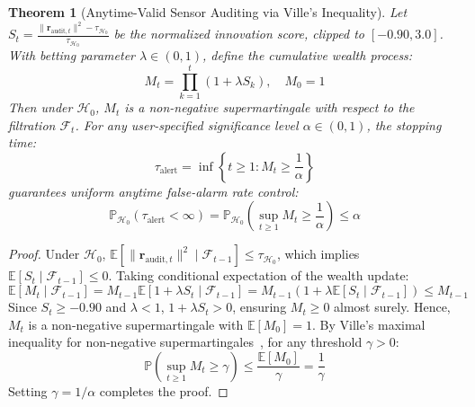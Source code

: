 \documentclass[11pt,a4paper]{article}
\newtheorem{theorem}{Theorem}[section]
\begin{document}
\begin{theorem}[Anytime-Valid Sensor Auditing via Ville's Inequality]
Let $S_t = \frac{\|\mathbf{r}_{\text{audit}, t}\|^2 - \tau_{\mathcal{H}_0}}{\tau_{\mathcal{H}_0}}$ be the normalized innovation score, clipped to $[-0.90, 3.0]$. With betting parameter $\lambda \in (0, 1)$, define the cumulative wealth process:
\begin{equation}
M_t = \prod_{k=1}^t (1 + \lambda S_k), \quad M_0 = 1
\label{eq:ville_wealth}
\end{equation}
Then under $\mathcal{H}_0$, $M_t$ is a non-negative supermartingale with respect to the filtration $\mathcal{F}_t$. For any user-specified significance level $\alpha \in (0, 1)$, the stopping time:
\begin{equation}
\tau_{\text{alert}} = \inf \left\{ t \ge 1 : M_t \ge \frac{1}{\alpha} \right\}
\end{equation}
guarantees uniform anytime false-alarm rate control:
\begin{equation}
\mathbb{P}_{\mathcal{H}_0}(\tau_{\text{alert}} < \infty) = \mathbb{P}_{\mathcal{H}_0}\left(\sup_{t \ge 1} M_t \ge \frac{1}{\alpha}\right) \le \alpha
\label{eq:ville_inequality}
\end{equation}
\end{theorem}

\begin{proof}
Under $\mathcal{H}_0$, $\mathbb{E}[\|\mathbf{r}_{\text{audit}, t}\|^2 \mid \mathcal{F}_{t-1}] \le \tau_{\mathcal{H}_0}$, which implies $\mathbb{E}[S_t \mid \mathcal{F}_{t-1}] \le 0$. Taking conditional expectation of the wealth update:
\begin{equation}
\mathbb{E}[M_t \mid \mathcal{F}_{t-1}] = M_{t-1} \mathbb{E}[1 + \lambda S_t \mid \mathcal{F}_{t-1}] = M_{t-1} (1 + \lambda \mathbb{E}[S_t \mid \mathcal{F}_{t-1}]) \le M_{t-1}
\end{equation}
Since $S_t \ge -0.90$ and $\lambda < 1$, $1 + \lambda S_t > 0$, ensuring $M_t \ge 0$ almost surely. Hence, $M_t$ is a non-negative supermartingale with $\mathbb{E}[M_0] = 1$. By Ville's maximal inequality for non-negative supermartingales~\cite{ville1939etude}, for any threshold $\gamma > 0$:
\begin{equation}
\mathbb{P}\left(\sup_{t \ge 1} M_t \ge \gamma\right) \le \frac{\mathbb{E}[M_0]}{\gamma} = \frac{1}{\gamma}
\end{equation}
Setting $\gamma = 1/\alpha$ completes the proof.
\end{proof}
\end{document}
